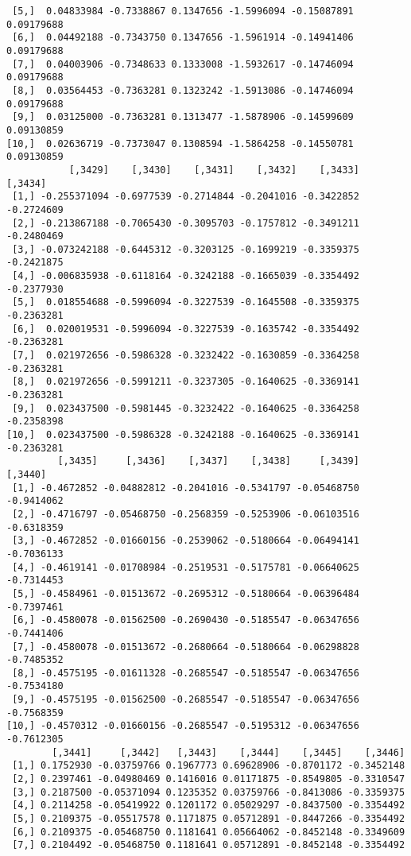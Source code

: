 \documentclass[
  letterpaper,
  DIV=11,
  numbers=noendperiod]{scrreprt}
\begin{document}
\begin{verbatim}
 [5,]  0.04833984 -0.7338867 0.1347656 -1.5996094 -0.15087891 0.09179688
 [6,]  0.04492188 -0.7343750 0.1347656 -1.5961914 -0.14941406 0.09179688
 [7,]  0.04003906 -0.7348633 0.1333008 -1.5932617 -0.14746094 0.09179688
 [8,]  0.03564453 -0.7363281 0.1323242 -1.5913086 -0.14746094 0.09179688
 [9,]  0.03125000 -0.7363281 0.1313477 -1.5878906 -0.14599609 0.09130859
[10,]  0.02636719 -0.7373047 0.1308594 -1.5864258 -0.14550781 0.09130859
           [,3429]    [,3430]    [,3431]    [,3432]    [,3433]    [,3434]
 [1,] -0.255371094 -0.6977539 -0.2714844 -0.2041016 -0.3422852 -0.2724609
 [2,] -0.213867188 -0.7065430 -0.3095703 -0.1757812 -0.3491211 -0.2480469
 [3,] -0.073242188 -0.6445312 -0.3203125 -0.1699219 -0.3359375 -0.2421875
 [4,] -0.006835938 -0.6118164 -0.3242188 -0.1665039 -0.3354492 -0.2377930
 [5,]  0.018554688 -0.5996094 -0.3227539 -0.1645508 -0.3359375 -0.2363281
 [6,]  0.020019531 -0.5996094 -0.3227539 -0.1635742 -0.3354492 -0.2363281
 [7,]  0.021972656 -0.5986328 -0.3232422 -0.1630859 -0.3364258 -0.2363281
 [8,]  0.021972656 -0.5991211 -0.3237305 -0.1640625 -0.3369141 -0.2363281
 [9,]  0.023437500 -0.5981445 -0.3232422 -0.1640625 -0.3364258 -0.2358398
[10,]  0.023437500 -0.5986328 -0.3242188 -0.1640625 -0.3369141 -0.2363281
         [,3435]     [,3436]    [,3437]    [,3438]     [,3439]    [,3440]
 [1,] -0.4672852 -0.04882812 -0.2041016 -0.5341797 -0.05468750 -0.9414062
 [2,] -0.4716797 -0.05468750 -0.2568359 -0.5253906 -0.06103516 -0.6318359
 [3,] -0.4672852 -0.01660156 -0.2539062 -0.5180664 -0.06494141 -0.7036133
 [4,] -0.4619141 -0.01708984 -0.2519531 -0.5175781 -0.06640625 -0.7314453
 [5,] -0.4584961 -0.01513672 -0.2695312 -0.5180664 -0.06396484 -0.7397461
 [6,] -0.4580078 -0.01562500 -0.2690430 -0.5185547 -0.06347656 -0.7441406
 [7,] -0.4580078 -0.01513672 -0.2680664 -0.5180664 -0.06298828 -0.7485352
 [8,] -0.4575195 -0.01611328 -0.2685547 -0.5185547 -0.06347656 -0.7534180
 [9,] -0.4575195 -0.01562500 -0.2685547 -0.5185547 -0.06347656 -0.7568359
[10,] -0.4570312 -0.01660156 -0.2685547 -0.5195312 -0.06347656 -0.7612305
        [,3441]     [,3442]   [,3443]    [,3444]    [,3445]    [,3446]
 [1,] 0.1752930 -0.03759766 0.1967773 0.69628906 -0.8701172 -0.3452148
 [2,] 0.2397461 -0.04980469 0.1416016 0.01171875 -0.8549805 -0.3310547
 [3,] 0.2187500 -0.05371094 0.1235352 0.03759766 -0.8413086 -0.3359375
 [4,] 0.2114258 -0.05419922 0.1201172 0.05029297 -0.8437500 -0.3354492
 [5,] 0.2109375 -0.05517578 0.1171875 0.05712891 -0.8447266 -0.3354492
 [6,] 0.2109375 -0.05468750 0.1181641 0.05664062 -0.8452148 -0.3349609
 [7,] 0.2104492 -0.05468750 0.1181641 0.05712891 -0.8452148 -0.3354492

\end{verbatim}
\end{document}
